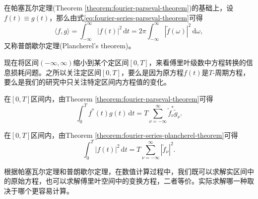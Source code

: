 \begin{theorem}
  \label{theorem:fourier-series-plancherel-theorem}
在帕塞瓦尔定理(Theorem \ref{theorem:fourier-parseval-theorem})的基础上，设$f(t) \equiv g(t)$，那么由式\eqref{eq:fourier-series-parseval-theorem}可得
\begin{equation}
  \label{eq:fourier-series-plancherel-theorem}
  \langle f, g \rangle = \int_{-\infty}^{\infty} \left| f(t) \right|^{2} \, \mathrm{d} t
  = 2 \pi \int_{-\infty}^{\infty} \left| \tilde{f} \left( \omega \right) \right|^{2} \, \mathrm{d} \omega,
\end{equation}
又称普朗歇尔定理(Plancherel's theorem)。
\end{theorem}

现在将区间$\left( - \infty, \infty \right)$缩小到某个定区间$\left[ 0, T \right]$，来看傅里叶级数中方程转换的信息损耗问题。之所以关注定区间$\left[ 0, T \right]$，要么是因为原方程$f(t)$是$T$-周期方程，要么是我们的研究中只关注特定区间内方程值的变化。
\begin{theorem}
\label{theorem:fourier-parseval-theorem-series}
在$[0,T]$区间内，由Theorem \ref{theorem:fourier-parseval-theorem}可得
\begin{equation}
  \label{eq:fourier-parseval-theorem-series}
  \int_{0}^{T} f^{*} \left( t \right) g \left( t \right) \, \mathrm{d} t
  = T \sum_{\nu = - \infty}^{\infty} \tilde{f}_{\nu}^{*} \tilde{g}_{\nu}.
\end{equation}
\end{theorem}

\begin{theorem}
  \label{theorem:fourier-series-plancherel-theorem-series}
在$[0,T]$区间内，由Theorem \ref{theorem:fourier-series-plancherel-theorem}可得
\begin{equation}
  \label{eq:fourier-series-plancherel-theorem-series}
  \int_{0}^{T} \left| f(t) \right|^{2} \, \mathrm{d} t
  = T \sum_{\nu = - \infty}^{\infty} \left| \tilde{f}_{\nu} \right|^{2}.
\end{equation}
\end{theorem}

根据帕塞瓦尔定理和普朗歇尔定理，在数值计算过程中，我们既可以求解实区间中的原始方程，也可以求解傅里叶空间中的变换方程，二者等价。实际求解哪一种取决于哪个更容易计算。

